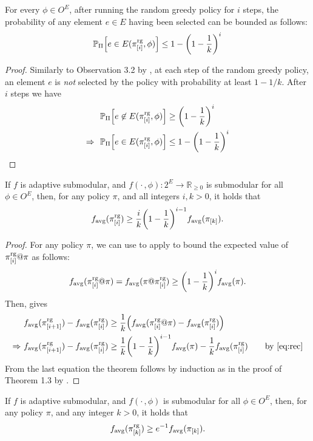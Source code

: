 \begin{lemma}\label{lem:sel}
  For every $\phi \in O^E$, after running the random greedy policy for $i$ steps, the probability of any element $e \in E$ having been selected can be bounded  as follows:
\begin{align*}
  \P[\Pi]{e \in E(\pigi, \phi)} \leq 1 - \left(1 - \frac{1}{k}\right)^i
\end{align*}
\end{lemma}
\begin{proof}
  Similarly to Observation 3.2 by \citet{buchbinder14}, at each step of the random greedy policy, an element $e$ is \emph{not} selected by the policy with probability at least $1 - 1/k$. After $i$ steps we have
  \begin{align*}
    &\P[\Pi]{e \not\in E(\pigi, \phi)} \geq \left(1 - \frac{1}{k}\right)^i\\
    \Rightarrow\ \ &\P[\Pi]{e \in E(\pigi, \phi)} \leq 1 - \left(1 - \frac{1}{k}\right)^i
  \end{align*}
\end{proof}

\begin{theorem}\label{thm:nonm}
  If $f$ is adaptive submodular, and $f(\cdot\,, \phi) : 2^E \to \mathbb{R}_{\geq 0}$ is submodular for all $\phi \in O^E$, then, for any policy $\pi$, and all integers $i, k > 0$, it holds that
  \begin{align*}
    \favg(\pigi) \geq \frac{i}{k}\left(1 - \frac{1}{k}\right)^{i-1}\favg(\pik).
  \end{align*}
\end{theorem}
\begin{proof}
  For any policy $\pi$, we can use  to apply  to bound the expected value of $\pi^{\textrm{rg}}_{[i]} @ \pi$ as follows:
  \begin{align}\label{eq:rec}
    \favg(\pigi @ \pi) = \favg(\pi @ \pigi) \geq \left(1 - \frac{1}{k}\right)^i \favg(\pi).
  \end{align}
  Then,  gives
  {\small
  \begin{align*}
    &\favg(\pigii) - \favg(\pigi) \geq \frac{1}{k}\left(\favg(\pigi @ \pi) - \favg(\pigi)\right)\\
    \Rightarrow\ &\favg(\pigii) - \favg(\pigi) \geq \frac{1}{k}\left(1 - \frac{1}{k}\right)^{i-1}\favg(\pi) - \frac{1}{k}\favg(\pigi) \tag*{by \eqref{eq:rec}}
  \end{align*}
  }
  From the last equation the theorem follows by induction as in the proof of Theorem 1.3 by \citet{buchbinder14}.
\end{proof}

\begin{cor}
  If $f$ is adaptive submodular, and $f(\cdot\,, \phi)$ is submodular for all $\phi \in O^E$, then, for any policy $\pi$, and any integer $k > 0$, it holds that
  \begin{align*}
    f_{\mathrm{avg}}(\pi^{\textrm{rg}}_{[k]}) \geq e^{-1}f_{\mathrm{avg}}(\pi_{[k]}).
  \end{align*}
\end{cor}
